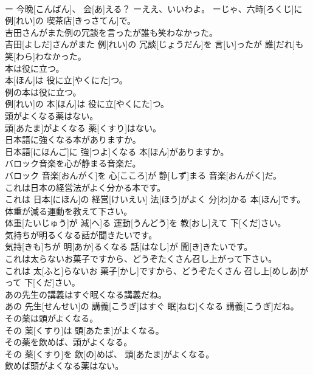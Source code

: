 \documentclass[8pt]{extreport}
\begin{document}
\begin{CJK}{UTF8}{min}
\\	ー 今晩[こんばん]、 会[あ]える？ ーええ、いいわよ。 ーじゃ、六時[ろくじ]に 例[れい]の 喫茶店[きっさてん]で。
\\	吉田さんがまた例の冗談を言ったが誰も笑わなかった。	
\\	吉田[よしだ]さんがまた 例[れい]の 冗談[じょうだん]を 言[い]ったが 誰[だれ]も 笑[わら]わなかった。
\\	本は役に立つ。	
\\	本[ほん]は 役に立[やくにた]つ。
\\	例の本は役に立つ。	
\\	例[れい]の 本[ほん]は 役に立[やくにた]つ。
\\	頭がよくなる薬はない。	
\\	頭[あたま]がよくなる 薬[くすり]はない。
\\	日本語に強くなる本がありますか。	
\\	日本語[にほんご]に 強[つよ]くなる 本[ほん]がありますか。
\\	バロック音楽を心が静まる音楽だ。	
\\	バロック 音楽[おんがく]を 心[こころ]が 静[しず]まる 音楽[おんがく]だ。
\\	これは日本の経営法がよく分かる本です。	
\\	これは 日本[にほん]の 経営[けいえい] 法[ほう]がよく 分[わ]かる 本[ほん]です。
\\	体重が減る運動を教えて下さい。	
\\	体重[たいじゅう]が 減[へ]る 運動[うんどう]を 教[おし]えて 下[くだ]さい。
\\	気持ちが明るくなる話が聞きたいです。	
\\	気持[きも]ちが 明[あか]るくなる 話[はなし]が 聞[き]きたいです。
\\	これは太らないお菓子ですから、どうぞたくさん召し上がって下さい。	
\\	これは 太[ふと]らないお 菓子[かし]ですから、どうぞたくさん 召し上[めしあ]がって 下[くだ]さい。
\\	あの先生の講義はすぐ眠くなる講義だね。	
\\	あの 先生[せんせい]の 講義[こうぎ]はすぐ 眠[ねむ]くなる 講義[こうぎ]だね。
\\	その薬は頭がよくなる。	
\\	その 薬[くすり]は 頭[あたま]がよくなる。
\\	その薬を飲めば、頭がよくなる。	
\\	その 薬[くすり]を 飲[の]めば、 頭[あたま]がよくなる。
\\	飲めば頭がよくなる薬はない。	

\end{CJK}
\end{document}
